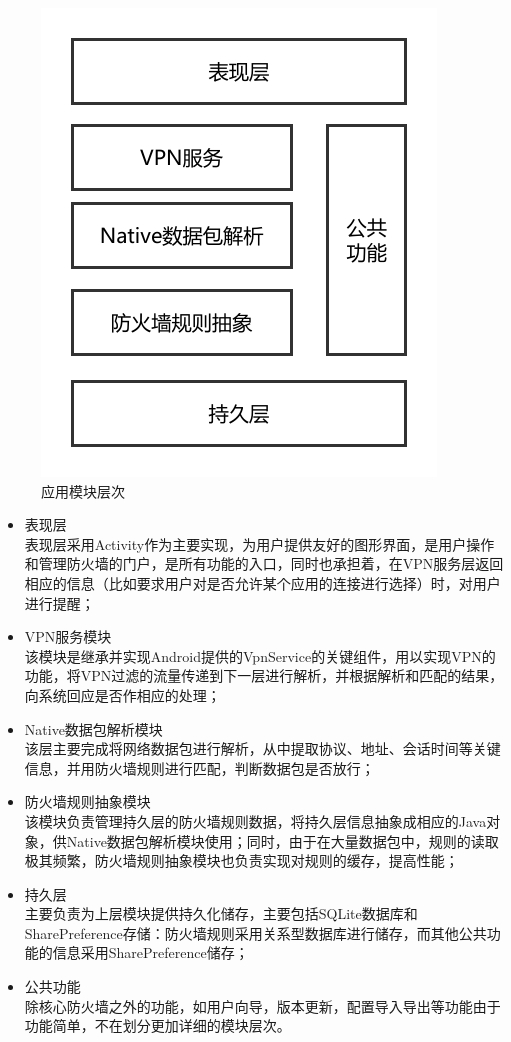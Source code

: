 \documentclass[format=final, language=chinese, degree=fyp]{hustthesis}
\begin{document}
\begin{figure}[!h]
\centering
\includegraphics[width=.6\textwidth]{modules.pdf}
\caption{应用模块层次}\label{fig:5}
\end{figure}

\begin{itemize}
	\item 表现层\\ 表现层采用Activity作为主要实现，为用户提供友好的图形界面，是用户操作和管理防火墙的门户，是所有功能的入口，同时也承担着，在VPN服务层返回相应的信息（比如要求用户对是否允许某个应用的连接进行选择）时，对用户进行提醒；
	\item VPN服务模块\\该模块是继承并实现Android提供的VpnService的关键组件，用以实现VPN的功能，将VPN过滤的流量传递到下一层进行解析，并根据解析和匹配的结果，向系统回应是否作相应的处理；
	\item Native数据包解析模块\\该层主要完成将网络数据包进行解析，从中提取协议、地址、会话时间等关键信息，并用防火墙规则进行匹配，判断数据包是否放行；
	\item 防火墙规则抽象模块\\该模块负责管理持久层的防火墙规则数据，将持久层信息抽象成相应的Java对象，供Native数据包解析模块使用；同时，由于在大量数据包中，规则的读取极其频繁，防火墙规则抽象模块也负责实现对规则的缓存，提高性能；
	\item 持久层\\主要负责为上层模块提供持久化储存，主要包括SQLite数据库和SharePreference存储：防火墙规则采用关系型数据库进行储存，而其他公共功能的信息采用SharePreference储存；
	\item 公共功能\\除核心防火墙之外的功能，如用户向导，版本更新，配置导入导出等功能由于功能简单，不在划分更加详细的模块层次。
\end{itemize}
\end{document}
